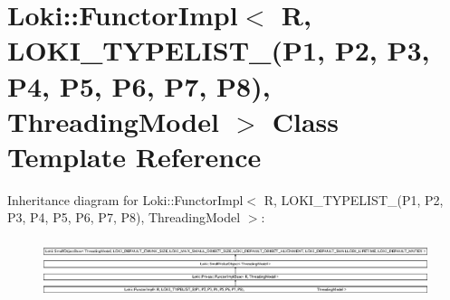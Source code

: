 \hypertarget{classLoki_1_1FunctorImpl_3_01R_00_01LOKI__TYPELIST__8_07P1_00_01P2_00_01P3_00_01P4_00_01P5_00_0107a4feb1ead61f16d15a34e72c5289f3}{}\section{Loki\+:\+:Functor\+Impl$<$ R, L\+O\+K\+I\+\_\+\+T\+Y\+P\+E\+L\+I\+S\+T\+\_(P1, P2, P3, P4, P5, P6, P7, P8), Threading\+Model $>$ Class Template Reference}
\label{classLoki_1_1FunctorImpl_3_01R_00_01LOKI__TYPELIST__8_07P1_00_01P2_00_01P3_00_01P4_00_01P5_00_0107a4feb1ead61f16d15a34e72c5289f3}
Inheritance diagram for Loki\+:\+:Functor\+Impl$<$ R, L\+O\+K\+I\+\_\+\+T\+Y\+P\+E\+L\+I\+S\+T\+\_(P1, P2, P3, P4, P5, P6, P7, P8), Threading\+Model $>$\+:\begin{figure}[H]
\begin{center}
\leavevmode
\includegraphics[height=1.751368cm]{classLoki_1_1FunctorImpl_3_01R_00_01LOKI__TYPELIST__8_07P1_00_01P2_00_01P3_00_01P4_00_01P5_00_0107a4feb1ead61f16d15a34e72c5289f3}
\end{center}
\end{figure}
